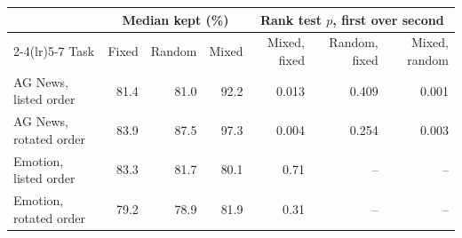 \begin{tabular}{lrrrrrr}
\toprule
 & \multicolumn{3}{c}{Median kept (\%)} & \multicolumn{3}{c}{Rank test $p$, first over second} \\
\cmidrule(lr){2-4}\cmidrule(lr){5-7}
Task & Fixed & Random & Mixed & Mixed, fixed & Random, fixed & Mixed, random \\
\midrule
AG News, listed order & 81.4 & 81.0 & 92.2 & 0.013 & 0.409 & 0.001 \\
AG News, rotated order & 83.9 & 87.5 & 97.3 & 0.004 & 0.254 & 0.003 \\
Emotion, listed order & 83.3 & 81.7 & 80.1 & 0.71 & -- & -- \\
Emotion, rotated order & 79.2 & 78.9 & 81.9 & 0.31 & -- & -- \\
\bottomrule
\end{tabular}
